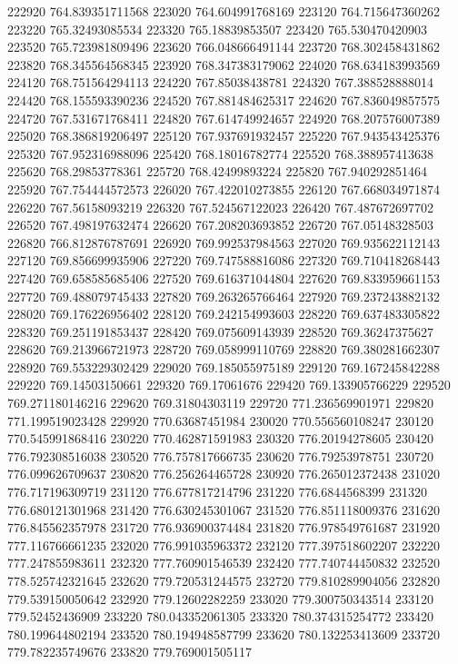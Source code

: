 {222920 764.839351711568
223020 764.604991768169
223120 764.715647360262
223220 765.32493085534
223320 765.18839853507
223420 765.530470420903
223520 765.723981809496
223620 766.048666491144
223720 768.302458431862
223820 768.345564568345
223920 768.347383179062
224020 768.634183993569
224120 768.751564294113
224220 767.85038438781
224320 767.388528888014
224420 768.155593390236
224520 767.881484625317
224620 767.836049857575
224720 767.531671768411
224820 767.614749924657
224920 768.207576007389
225020 768.386819206497
225120 767.937691932457
225220 767.943543425376
225320 767.952316988096
225420 768.18016782774
225520 768.388957413638
225620 768.29853778361
225720 768.42499893224
225820 767.940292851464
225920 767.754444572573
226020 767.422010273855
226120 767.668034971874
226220 767.56158093219
226320 767.524567122023
226420 767.487672697702
226520 767.498197632474
226620 767.208203693852
226720 767.05148328503
226820 766.812876787691
226920 769.992537984563
227020 769.935622112143
227120 769.856699935906
227220 769.747588816086
227320 769.710418268443
227420 769.658585685406
227520 769.616371044804
227620 769.833959661153
227720 769.488079745433
227820 769.263265766464
227920 769.237243882132
228020 769.176226956402
228120 769.242154993603
228220 769.637483305822
228320 769.251191853437
228420 769.075609143939
228520 769.36247375627
228620 769.213966721973
228720 769.058999110769
228820 769.380281662307
228920 769.553229302429
229020 769.185055975189
229120 769.167245842288
229220 769.14503150661
229320 769.17061676
229420 769.133905766229
229520 769.271180146216
229620 769.31804303119
229720 771.236569901971
229820 771.199519023428
229920 770.63687451984
230020 770.556560108247
230120 770.545991868416
230220 770.462871591983
230320 776.20194278605
230420 776.792308516038
230520 776.757817666735
230620 776.79253978751
230720 776.099626709637
230820 776.256264465728
230920 776.265012372438
231020 776.717196309719
231120 776.677817214796
231220 776.6844568399
231320 776.680121301968
231420 776.630245301067
231520 776.851118009376
231620 776.845562357978
231720 776.936900374484
231820 776.978549761687
231920 777.116766661235
232020 776.991035963372
232120 777.397518602207
232220 777.247855983611
232320 777.760901546539
232420 777.740744450832
232520 778.525742321645
232620 779.720531244575
232720 779.810289904056
232820 779.539150050642
232920 779.12602282259
233020 779.300750343514
233120 779.52452436909
233220 780.043352061305
233320 780.374315254772
233420 780.199644802194
233520 780.194948587799
233620 780.132253413609
233720 779.782235749676
233820 779.769001505117
}
